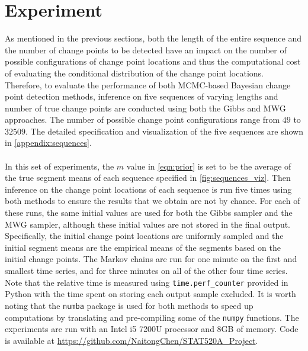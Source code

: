 

\section{Experiment}
As mentioned in the previous sections, both the length of the entire sequence and the number of change points to be detected have an impact on the number of possible configurations of change point locations and thus the computational cost of evaluating the conditional distribution of the change point locations. Therefore, to evaluate the performance of both MCMC-based Bayesian change point detection methods, inference on five sequences of varying lengths and number of true change points are conducted using both the Gibbs and MWG approaches. The number of possible change point configurations range from $49$ to $32509$. The detailed specification and visualization of the five sequences are shown in \cref{appendix:sequences}.\\\\
In this set of experiments, the $m$ value in \cref{eqn:prior} is set to be the average of the true segment means of each sequence specified in \cref{fig:sequences_viz}. Then inference on the change point locations of each sequence is run five times using both methods to ensure the results that we obtain are not by chance. For each of these runs, the same initial values are used for both the Gibbs sampler and the MWG sampler, although these initial values are not stored in the final output. Specifically, the initial change point locations are uniformly sampled and the initial segment means are the empirical means of the segments based on the initial change points. The Markov chains are run for one minute on the first and smallest time series, and for three minutes on all of the other four time series. Note that the relative time is measured using \texttt{time.perf\_counter} provided in Python with the time spent on storing each output sample excluded. It is worth noting that the \texttt{numba} package is used for both methods to speed up computations by translating and pre-compiling some of the \texttt{numpy} functions. The experiments are run with an Intel i5 7200U processor and 8GB of memory. Code is available at \url{https://github.com/NaitongChen/STAT520A_Project}.
